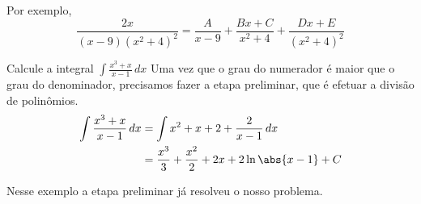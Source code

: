 Por exemplo,
\[
  \frac{2x}{(x-9)(x^2+4)^2}
  = \frac{A}{x-9}
  + \frac{Bx+C}{x^2+4}
  + \frac{Dx+E}{(x^2+4)^2}
\]

\begin{example}
  Calcule a integral \(\int \frac{x^3+x}{x-1}\,dx\)
  \solution
  Uma vez que o grau do numerador é maior que o grau do denominador, precisamos
  fazer a etapa preliminar, que é efetuar a divisão de polinômios.
  \begin{align*}
    \int \frac{x^3+x}{x-1}\,dx
    & = \int x^2+x+2 + \frac{2}{x-1} \, dx \\
    & = \frac{x^3}{3}
      + \frac{x^2}{2}
      + 2x
      + 2 \ln\abs{x-1}
      + C
  \end{align*}
\end{example}

Nesse exemplo a etapa preliminar já resolveu o nosso problema.


